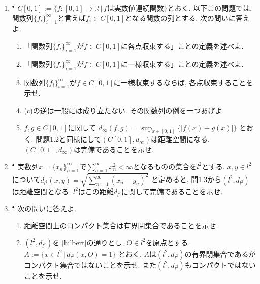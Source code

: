\documentclass[dvipdfmx,a4paper,11pt]{article}
\newcommand{\R}{\mathbb{R}}
\theoremstyle{definition}
\begin{document}
\begin{enumerate}[label=\textbf{問}10.\arabic*]



\item \label{uniform} $^{\bullet}$  $C[0,1] := \{ f : [0,1] \rightarrow \R \,|\, \text{$f$は実数値連続関数}\}$とおく. 以下この問題では, 関数列$\{ f_{i}\}_{i=1}^{\infty}$と言えば$f_i \in C[0,1]$となる関数の列とする. 次の問いに答えよ.
\begin{enumerate}
\setlength{\parskip}{0cm}
  \setlength{\itemsep}{2pt} 
\item 「関数列$\{ f_{i}\}_{i=1}^{\infty}$が$f \in C[0,1]$に各点収束する」ことの定義を述べよ.
\item 「関数列$\{ f_{i}\}_{i=1}^{\infty}$が$f \in C[0,1]$に一様収束する」ことの定義を述べよ. 
\item 関数列$\{ f_{i}\}_{i=1}^{\infty}$が$f \in C[0,1]$に一様収束するならば, 各点収束することを示せ. 
\item (c)の逆は一般には成り立たない. その関数列の例を一つあげよ.
\item $f,g \in C[0,1]$に関して
$
d_{\infty}(f,g)=\sup_{x \in [0,1] }\{ |f(x) - g(x)|\}
$
とおく. 問題1.2と同様にして$(C[0,1], d_{\infty})$は距離空間になる. 
$(C[0,1], d_{\infty})$は完備であることを示せ.
\end{enumerate}

\item \label{hilbert} $^{\bullet}$ 実数列$x = \{ x_n\}_{n=1}^{\infty}$で$\sum_{n=1}^{\infty} x_{n}^{2} < \infty$となるものの集合を$l^2$とする.
 $x,y \in l^2$について$d_{ l^2}(x,y) = \sqrt{ \sum_{n=1}^{\infty} (x_n- y_n)^2}$
 と定めると, 問1.3から$(l^2,d_{ l^2})$は距離空間となる. $l^2$はこの距離$d_{ l^2}$に関して完備であることを示せ.

\item $^{\bullet}$ 次の問いに答えよ.
	\begin{enumerate}
	\setlength{\parskip}{0cm}
  \setlength{\itemsep}{2pt} 
	\item 距離空間上のコンパクト集合は有界閉集合であることを示せ.
	\item $(l^2,d_{ l^2})$を \ref{hilbert}の通りとし, $O \in l^2$を原点とする. 
	$
	A := \{ x  \in  l^2 \,|\, d_{ l^2}(x,O)=1\}
	$
	とおく. $A$は$(l^2,d_{ l^2})$の有界閉集合であるがコンパクト集合ではないことを示せ. また$(l^2,d_{ l^2})$もコンパクトではないことを示せ.
	 \end{enumerate}




\end{enumerate}
\end{document}

